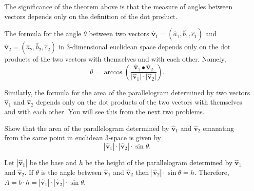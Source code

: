 \documentclass[newpage,hints,handout]{ximera}
\begin{document}
The significance of the theorem above is that the measure of angles between
vectors depends only on the definition of the dot product.

\begin{corollary}
The formula for the angle $\theta$ between two vectors $\hat{\mathbf v}_{1}=
(\hat{a}_{1},\hat{b}_{1},\hat{c}_{1})$ and $\hat{\mathbf v}_{2}=
(\hat{a}_{2},\hat{b}_{2},\hat{c}_{2})$ in $3$-dimensional euclidean space
depends only on the dot products of the two vectors with themselves and with
each other.  Namely,%
\[
\theta=\arccos\left(\frac{\hat{\mathbf v}_{1}\bullet\hat{\mathbf v}_{2}}
                   {\lvert \hat{\mathbf v}_{1}\rvert \cdot \lvert \hat{\mathbf v}_{2}\rvert}\right).
\]
\end{corollary}

Similarly, the formula for the area of the parallelogram determined by two
vectors $\hat{\mathbf v}_{1}$ and $\hat{\mathbf v}_{2}$ depends only on the dot
products of the two vectors with themselves and with each other. You will see
this from the next two problems.

\begin{problem}
Show that the area of the parallelogram determined by $\hat{\mathbf v}_{1}$ and
$\hat{\mathbf v}_{2}$ emanating from the same point in euclidean $3$-space is
given by%
\[
|\hat{\mathbf v}_{1}|\cdot|\hat{\mathbf v}_{2}|\cdot\sin\theta.
\]


\begin{freeResponse}

Let $|\hat{\mathbf v}_{1}|$ be the base and $h$ be the height of the parallelogram determined by  $\hat{\mathbf v}_{1}$ and $\hat{\mathbf v}_{2}$.  If $\theta$ is the angle between $\hat{\mathbf v}_{1}$ and $\hat{\mathbf v}_{2}$ then $|\hat{\mathbf v}_{2}|\cdot \sin\theta = h$. Therefore, $A = b \cdot h = |\hat{\mathbf v}_{1}| \cdot |\hat{\mathbf v}_{2}| \cdot\sin\theta$.

\end{freeResponse}
\end{problem}
\end{document}
